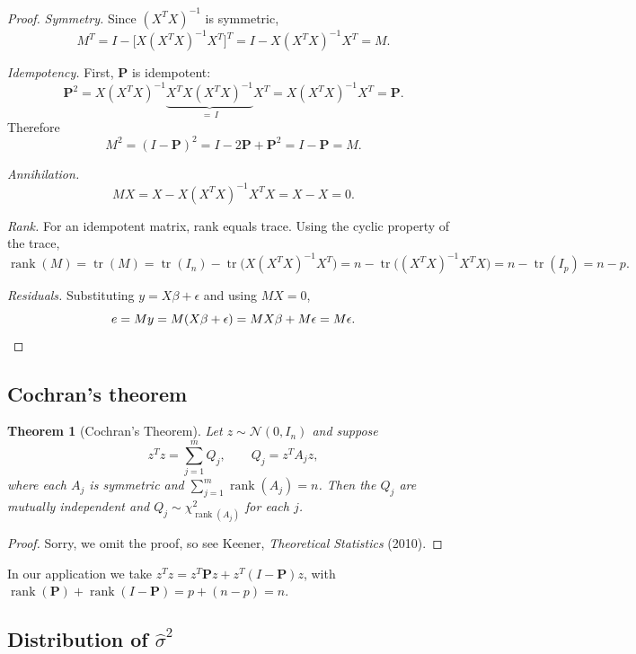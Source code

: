 \documentclass[11pt]{article}
\newtheorem{theorem}{Theorem}
\theoremstyle{definition}
\begin{document}
\begin{proof}
    \emph{Symmetry.} Since $(X^T X)^{-1}$ is symmetric,
    $$M^T = I - \big[X (X^T X)^{-1} X^T\big]^T = I - X (X^T X)^{-1} X^T = M.$$

    \emph{Idempotency.} First, $\mathbf{P}$ is idempotent:
    $$\mathbf{P}^2 = X (X^T X)^{-1} \underbrace{X^T X (X^T X)^{-1}}_{= \, I} X^T = X (X^T X)^{-1} X^T = \mathbf{P}.$$
    Therefore
    $$M^2 = (I - \mathbf{P})^2 = I - 2\mathbf{P} + \mathbf{P}^2 = I - \mathbf{P} = M.$$

    \emph{Annihilation.} 
    $$MX = X - X (X^T X)^{-1} X^T X = X - X = 0.$$

    \emph{Rank.} For an idempotent matrix, rank equals trace. Using the
    cyclic property of the trace,
    $$\operatorname{rank}(M) = \operatorname{tr}(M) = \operatorname{tr}(I_n) - \operatorname{tr}\big(X (X^T X)^{-1} X^T\big) = n - \operatorname{tr}\big((X^T X)^{-1} X^T X\big) = n - \operatorname{tr}(I_p) = n - p.$$

    \emph{Residuals.} Substituting $y = X\beta + \epsilon$ and using $MX = 0$,
    $$e = My = M(X\beta + \epsilon) = MX\beta + M\epsilon = M\epsilon. \qedhere$$
\end{proof}


\subsection{Cochran's theorem}
\begin{theorem}[Cochran's Theorem]\label{thm:cochran}
    Let $z \sim \mathcal{N}(0, I_n)$ and suppose
    $$z^T z = \sum^m_{j=1} Q_j, \qquad Q_j = z^T A_j z,$$
    where each $A_j$ is symmetric and $\sum^m_{j=1} \operatorname{rank}(A_j) = n$.
    Then the $Q_j$ are mutually independent and
    $Q_j \sim \chi^2_{\operatorname{rank}(A_j)}$ for each $j$.
\end{theorem}

\begin{proof}
    Sorry, we omit the proof, so see Keener, \emph{Theoretical Statistics} (2010).
\end{proof}

In our application we take $z^T z = z^T \mathbf{P} z + z^T (I - \mathbf{P}) z$,
with $\operatorname{rank}(\mathbf{P}) + \operatorname{rank}(I - \mathbf{P}) = p + (n - p) = n$.

\subsection{Distribution of $\widehat{\sigma}^2$}
\end{document}
